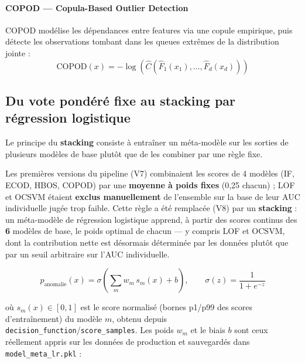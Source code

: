 \documentclass[12pt,a4paper]{report}
\begin{document}
\paragraph{COPOD — Copula-Based Outlier Detection \cite{li2022}}
COPOD modélise les dépendances entre features via une copule empirique, puis
détecte les observations tombant dans les queues extrêmes de la distribution jointe :
\begin{equation}
  \text{COPOD}(x) = -\log\!\left(\hat{C}\!\left(\hat{F}_1(x_1),\ldots,\hat{F}_d(x_d)\right)\right)
\end{equation}

\subsection{Du vote pondéré fixe au stacking par régression logistique}
\label{subsec:stacking}

Le principe du \textbf{stacking} \cite{wolpert1992} consiste à entraîner un méta-modèle
sur les sorties de plusieurs modèles de base plutôt que de les combiner par une règle fixe.

\begin{correctionbox}
Les premières versions du pipeline (V7) combinaient les scores de 4 modèles
(IF, ECOD, HBOS, COPOD) par une \textbf{moyenne à poids fixes} (0,25 chacun) ;
LOF et OCSVM étaient \textbf{exclus manuellement} de l'ensemble sur la base de
leur AUC individuelle jugée trop faible. Cette règle a été remplacée (V8) par
un \textbf{stacking} : un méta-modèle de régression logistique apprend, à
partir des scores continus des \textbf{6} modèles de base, le poids optimal de
chacun — y compris LOF et OCSVM, dont la contribution nette est désormais
déterminée par les données plutôt que par un seuil arbitraire sur l'AUC
individuelle.
\end{correctionbox}

\begin{equation}
  p_{\text{anomalie}}(x) = \sigma\!\left(\sum_{m} w_m \, s_m(x) + b\right),
  \qquad \sigma(z) = \frac{1}{1+e^{-z}}
\end{equation}

\noindent où $s_m(x) \in [0,1]$ est le score normalisé (bornes p1/p99 des
scores d'entraînement) du modèle $m$, obtenu depuis
\texttt{decision\_function}/\texttt{score\_samples}. Les poids $w_m$ et le
biais $b$ sont ceux réellement appris sur les données de production et
sauvegardés dans \texttt{model\_meta\_lr.pkl} :
\end{document}
